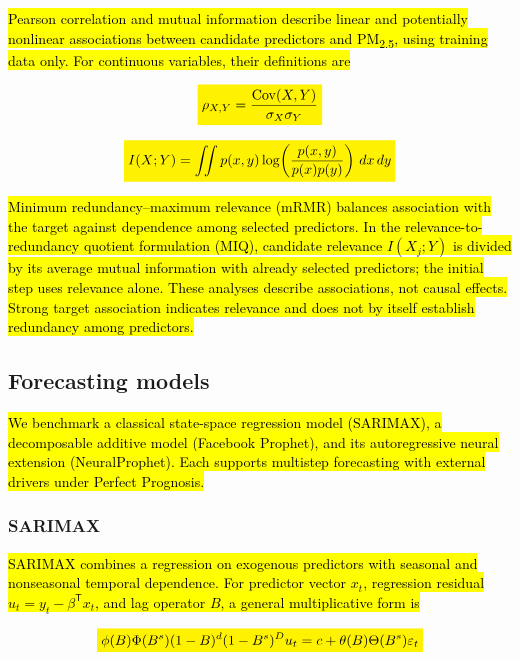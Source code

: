\documentclass[pdflatex,sn-basic,Numbered]{sn-jnl}
\newcommand{\rev}[1]{\hl{#1}}
\newcommand{\revmath}[1]{\colorbox{yellow}{$\displaystyle #1$}}
\begin{document}
\rev{Pearson correlation and mutual information describe linear and potentially nonlinear associations between candidate predictors and PM\textsubscript{2.5}, using training data only. For continuous variables, their definitions are}

\begin{equation}
\revmath{\rho_{X,Y}=\frac{\mathrm{Cov}(X,Y)}{\sigma_X\sigma_Y}}
\label{eq:pearson}
\end{equation}

\begin{equation}
\revmath{I(X;Y)=\iint p(x,y)\log\!\left(\frac{p(x,y)}{p(x)p(y)}\right)\,dx\,dy}
\label{eq:mi}
\end{equation}

\rev{Minimum redundancy--maximum relevance (mRMR) balances association with the target against dependence among selected predictors. In the relevance-to-redundancy quotient formulation (MIQ), candidate relevance $I(X_j;Y)$ is divided by its average mutual information with already selected predictors; the initial step uses relevance alone. These analyses describe associations, not causal effects. Strong target association indicates relevance and does not by itself establish redundancy among predictors.}

\subsection{Forecasting models}\label{subsec:models}

\rev{We benchmark a classical state-space regression model (SARIMAX), a decomposable additive model (Facebook Prophet), and its autoregressive neural extension (NeuralProphet). Each supports multistep forecasting with external drivers under Perfect Prognosis.}

\subsubsection{SARIMAX}

\rev{SARIMAX combines a regression on exogenous predictors with seasonal and nonseasonal temporal dependence. For predictor vector $x_t$, regression residual $u_t=y_t-\beta^{\mathsf T}x_t$, and lag operator $B$, a general multiplicative form is}

\begin{equation}
\revmath{\phi(B)\Phi(B^s)(1-B)^d(1-B^s)^D u_t=c+\theta(B)\Theta(B^s)\varepsilon_t}
\label{eq:sarimax}
\end{equation}
\end{document}
